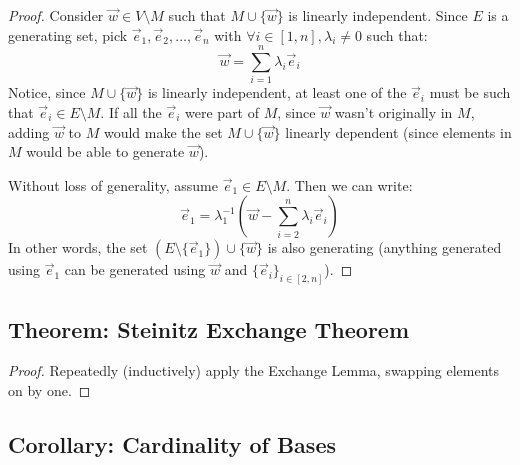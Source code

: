 \documentclass{exam}
\begin{document}
\begin{proof}

Consider $\vec{w} \in V \setminus M$ such that $M \cup \{\vec{w}\}$ is linearly independent. Since $E$ is a generating set, pick $\vec{e}_1, \vec{e}_2, \ldots, \vec{e}_n$ with $\forall i \in [1,n], \lambda_i \neq 0$ such that:
\[
\vec{w} = \sum_{i = 1}^n \lambda_i \vec{e}_i
\]
Notice, since $M \cup \{\vec{w}\}$ is linearly independent, at least one of the $\vec{e}_i$ must be such that $\vec{e}_i \in E \setminus M$. If all the $\vec{e}_i$ were part of $M$, since $\vec{w}$ wasn't originally in $M$, adding $\vec{w}$ to $M$ would make the set $M \cup \{\vec{w}\}$ linearly dependent (since elements in $M$ would be able to generate $\vec{w}$).

\bigskip

Without loss of generality, assume $\vec{e}_1 \in E\setminus M$. Then we can write:
\[
\vec{e}_1 = \lambda_1^{-1}\left(\vec{w} - \sum_{i = 2}^n \lambda_i \vec{e}_i\right)
\]
In other words, the set $(E \setminus \{\vec{e}_1\}) \cup \{\vec{w}\}$ is also generating (anything generated using $\vec{e}_1$ can be generated using $\vec{w}$ and $\{\vec{e}_i\}_{i \in [2,n]}$).

\end{proof}

\subsection{Theorem: Steinitz Exchange Theorem}


\begin{proof}
Repeatedly (inductively) apply the Exchange Lemma, swapping elements on by one.
\end{proof}

\subsection{Corollary: Cardinality of Bases}
\end{document}
